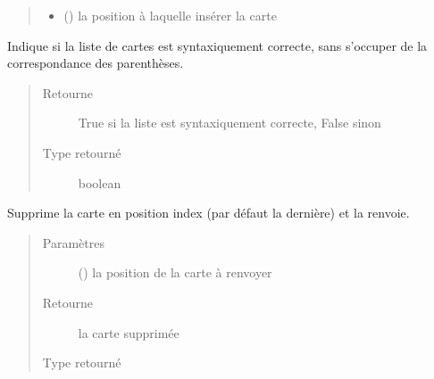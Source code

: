 \documentclass[letterpaper,10pt,french]{sphinxmanual}
\begin{document}
\begin{fulllineitems}
\begin{fulllineitems}
\begin{quote}
\begin{description}
\begin{itemize}
\item {} 
 () \textendash{} la position à laquelle insérer la carte

\end{itemize}

\end{description}\end{quote}

\end{fulllineitems}


\begin{fulllineitems}
\label{\detokenize{doc_classe:cards.CardList.is_syntactically_correct}}
Indique si la liste de cartes est syntaxiquement correcte,
sans s’occuper de la correspondance des parenthèses.
\begin{quote}\begin{description}
\item[{Retourne}] \leavevmode
True si la liste est syntaxiquement correcte, False sinon

\item[{Type retourné}] \leavevmode
boolean

\end{description}\end{quote}

\end{fulllineitems}


\begin{fulllineitems}
\label{\detokenize{doc_classe:cards.CardList.pop}}
Supprime la carte en position index (par défaut la dernière)
et la renvoie.
\begin{quote}\begin{description}
\item[{Paramètres}] \leavevmode
{} () \textendash{} la position de la carte à renvoyer

\item[{Retourne}] \leavevmode
la carte supprimée

\item[{Type retourné}] \leavevmode
{\hyperref[\detokenize{doc_classe:cards.Card}]{}}


\end{description}
\end{quote}
\end{fulllineitems}
\end{fulllineitems}
\end{document}
